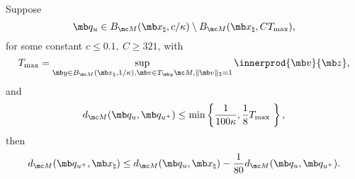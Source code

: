 \begin{lemma}\label{prop:one step in phase III}
Suppose
\begin{equation}
    \mb q_u \in B_{\mc M}(\mb x_\natural, c/\kappa) \setminus B_{\mc M}(\mb x_\natural, C T_{\max} ),
\end{equation}
for some constant $c \leq 0.1, \: C \ge 321$, with 
\begin{equation}
    T_{\max} = \sup_{\mb y \in B_{\mc M}(\mb x_\natural, 1/\kappa), \mb v \in T_{\mb y} \mc M, \| \mb v \|_2 =1} \innerprod{\mb v}{\mb z},
\end{equation}
and \begin{equation}
    d_{\mc M}(\mb q_u, \mb q_{u^+}) \leq \min \left\{ \frac{1}{100\kappa}, \frac{1}{8} T_{\max}\ \right\}, 
    \end{equation}
    then 
    \begin{equation}
        d_{\mc M}(\mb q_{u^+},\mb x_\natural) \leq  d_{\mc M}(\mb q_{u},\mb x_\natural) - \frac{1}{80} d_{\mc M}(\mb q_u, \mb q_{u^+}).    
    \end{equation}
\end{lemma}

